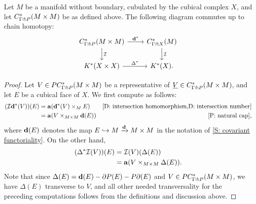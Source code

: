 \begin{proposition}\label{P: diag/intersect}
	Let $M$ be a manifold without boundary, cubulated by the cubical complex $X$, and let $C^*_{\Gamma \pitchfork P}(M \times M)$ be as defined above.
	The following diagram commutes up to chain homotopy:
	\[
	\begin{tikzcd}
	C^*_{\Gamma \pf P}(M \times M) \arrow[r,"\diag^*"] \arrow[d,"\mc I"]& C^*_{\Gamma \pf X}(M) \arrow[d,"\mc I"]  \\
	 \arrow[r,"\Delta^*"] K^*(X\times X)&K^*(X).
	\end{tikzcd}
	\]
\end{proposition}
\begin{proof}
	Let $V \in PC^*_{\Gamma \pitchfork P}(M \times M)$ be a representative of $\underline{V} \in C^*_{\Gamma \pitchfork P}(M \times M)$, and let $E$ be a cubical face of $X$.
	We first compute as follows:
	\begin{align*}
		(\mc I \diag^*(V))(E) & = \aug(\diag^*(V) \times_M  E) &\text{\cref{D: intersection homomorphism,D: intersection number}}\\
		&=\aug(V \times_{M \times M} \diag(E)) &\text{\cref{P: natural cap}},
	\end{align*}
	where $\mathbf{d}(E)$ denotes the map $E \hookrightarrow M \xrightarrow{\mathbf{d}} M \times M$ in the notation of \cref{S: covariant functoriality}.
	On the other hand,
		\begin{align*}
		(\Delta^*\mathcal{I}(V))(E) & = \mathcal{I}(V)(\Delta (E))\\
		&=\mathbf{a}(V \times_{M \times M} \Delta (E)).
	\end{align*}
	Note that since $\Delta (E) = \mathbf{d}(E) - \partial P(E) - P \partial(E)$ and $V \in PC^*_{\Gamma \pitchfork P}(M \times M)$, we have $\Delta(E)$ transverse to $V$, and all other needed transversality for the preceding computations follows from the definitions and discussion above.


\end{proof}
